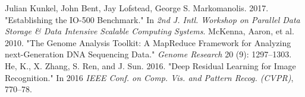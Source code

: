 \documentclass[conference]{IEEEtran}
\begin{document}
\begin{thebibliography}{9}
 Julian Kunkel, John Bent, Jay Lofstead, George S. Markomanolis. 2017. "Establishing the IO-500 Benchmark." In \textit{2nd J. Intl. Workshop on Parallel Data Storage \& Data Intensive Scalable Computing Systems}.
 McKenna, Aaron, et al. 2010. "The Genome Analysis Toolkit: A MapReduce Framework for Analyzing next-Generation DNA Sequencing Data." \textit{Genome Research} 20 (9): 1297–1303.
 He, K., X. Zhang, S. Ren, and J. Sun. 2016. "Deep Residual Learning for Image Recognition." In 2016 \textit{IEEE Conf. on Comp. Vis. and Pattern Recog. (CVPR)}, 770–78.
\end{thebibliography}
\end{document}

